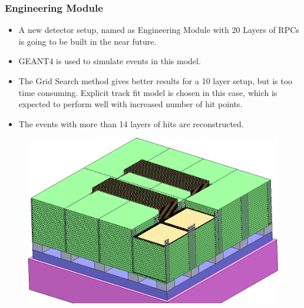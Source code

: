 \documentclass{beamer}
\begin{document}
\begin{frame}
  \frametitle{Engineering Module}
  \vspace*{-6pt}
  \begin{itemize} %
  \item A new detector setup, named as Engineering Module
    with 20 Layers of RPCs is going to be built in the near future.
  \item GEANT4 is used to simulate events in this model.
  \item The Grid Search method gives better results for a 10 layer
    setup, but is too time consuming. Explicit track fit model is
    chosen in this case, which is expected to perform well with
    increased number of hit points.
  \item The events with more than 14 layers of hits are reconstructed.
  \end{itemize}
  \vspace*{-4pt}
  \begin{figure}[h!]
    \includegraphics[width=0.6\linewidth]{engMod.png}
  \end{figure}
\end{frame}
\end{document}
